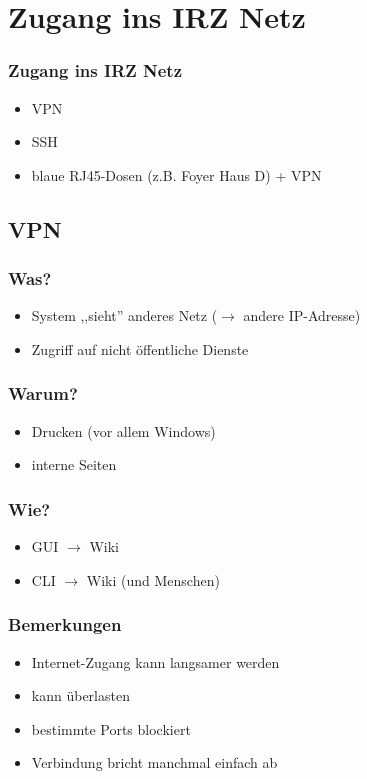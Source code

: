 \documentclass{beamer}
\begin{document}
    \section{Zugang ins IRZ Netz}
    \begin{frame}
        \frametitle{Zugang ins IRZ Netz}
        \begin{itemize}
            \item VPN
            \item SSH
            \item blaue RJ45-Dosen (z.B. Foyer Haus D) + VPN
        \end{itemize}
    \end{frame}

    \subsection{VPN}
    \begin{frame}
        \frametitle{Was?}
        \begin{itemize}
            \item System ,,sieht'' anderes Netz ($\rightarrow$ andere IP-Adresse)
            \item Zugriff auf nicht öffentliche Dienste
        \end{itemize}
    \end{frame}
    \begin{frame}
        \frametitle{Warum?}
        \begin{itemize}
            \item Drucken (vor allem Windows)
            \item interne Seiten
        \end{itemize}
    \end{frame}
    \begin{frame}
        \frametitle{Wie?}
        \begin{itemize}
            \item GUI $\longrightarrow$ Wiki
            \item CLI $\longrightarrow$ Wiki (und Menschen)
        \end{itemize}
    \end{frame}
    \begin{frame}
        \frametitle{Bemerkungen}
        \begin{itemize}
            \item Internet-Zugang kann langsamer werden
            \item kann überlasten
            \item bestimmte Ports blockiert
            \item Verbindung bricht manchmal einfach ab
        \end{itemize}
    \end{frame}
\end{document}
